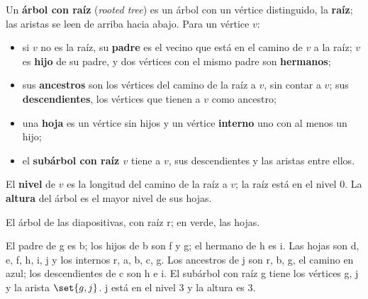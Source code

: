 \documentclass[11pt,letterpaper]{article}
\begin{document}
\begin{definicion}
  \label{def:arbol-raiz}
  Un \textbf{árbol con raíz} (\textit{rooted tree}) es un árbol con un
  vértice distinguido, la \textbf{raíz}; las aristas se leen de arriba
  hacia abajo. Para un vértice $v$:
  \begin{itemize}[itemsep=0.1em]
    \item si $v$ no es la raíz, su \textbf{padre} es el vecino que
          está en el camino de $v$ a la raíz; $v$ es \textbf{hijo} de
          su padre, y dos vértices con el mismo padre son
          \textbf{hermanos};
    \item sus \textbf{ancestros} son los vértices del camino de la
          raíz a $v$, sin contar a $v$; sus \textbf{descendientes},
          los vértices que tienen a $v$ como ancestro;
    \item una \textbf{hoja} es un vértice sin hijos y un vértice
          \textbf{interno} uno con al menos un hijo;
    \item el \textbf{subárbol con raíz $v$} tiene a $v$, sus
          descendientes y las aristas entre ellos.
  \end{itemize}
  El \textbf{nivel} de $v$ es la longitud del camino de la raíz a $v$;
  la raíz está en el nivel $0$. La \textbf{altura} del árbol es el
  mayor nivel de sus hojas.
\end{definicion}

\begin{ejemplo}
  \label{ej:arbol-vocabulario}
  El árbol de las diapositivas, con raíz r; en verde, las hojas.
  \begin{center}
  \end{center}
  El padre de g es b; los hijos de b son f y g; el hermano de h es i.
  Las hojas son d, e, f, h, i, j y los internos r, a, b, c, g. Los
  ancestros de j son r, b, g, el camino en azul; los descendientes de
  c son h e i. El subárbol con raíz g tiene los vértices g, j y la
  arista $\set{g, j}$. j está en el nivel $3$ y la altura es $3$.
\end{ejemplo}
\end{document}
